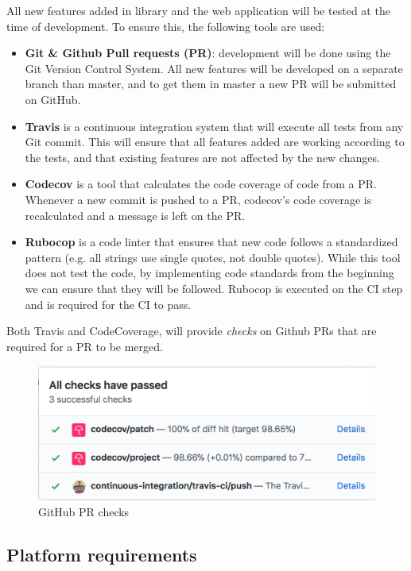 All new features added in library and the web application will be tested at the time of development. To ensure this, the following tools are used:
\begin{itemize}
  \item \textbf{Git \& Github Pull requests (PR)}: development will be done using the Git Version Control System. All new features will be developed on a separate branch than master, and to get them in master a new PR will be submitted on GitHub.
  \item \textbf{Travis} is a continuous integration system that will execute all tests from any Git commit. This will ensure that all features added are working according to the tests, and that existing features are not affected by the new changes.
  \item \textbf{Codecov} is a tool that calculates the code coverage of code from a PR. Whenever a new commit is pushed to a PR, codecov's code coverage is recalculated and a message is left on the PR.
  \item \textbf{Rubocop} is a code linter that ensures that new code follows a standardized pattern (e.g. all strings use single quotes, not double quotes). While this tool does not test the code, by implementing code standards from the beginning we can ensure that they will be followed. Rubocop is executed on the CI step and is required for the CI to pass.
\end{itemize}
Both Travis and CodeCoverage, will provide \textit{checks} on Github PRs that are required for a PR to be merged.

\begin{figure}[h]
    \centering
    \includegraphics[width=(\linewidth / 3 * 2)]{Chapters/3-RequirementAndSpecifications/github_checks.png}
    \caption{GitHub PR checks}
    \label{fig:github_pr}
\end{figure}

\subsection{Platform requirements}


